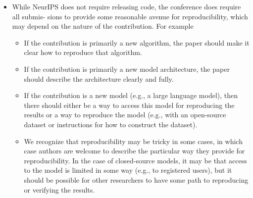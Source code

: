 \documentclass{article}
\begin{document}
\begin{enumerate}
\begin{itemize}
        \item While NeurIPS does not require releasing code, the conference does require all submis-
sions to provide some reasonable avenue for reproducibility, which may depend on the
nature of the contribution. For example
        \begin{itemize}
            \item[(a)] If the contribution is primarily a new algorithm, the paper should make it clear how
to reproduce that algorithm.
            \item[(b)] If the contribution is primarily a new model architecture, the paper should describe
the architecture clearly and fully.
            \item[(c)] If the contribution is a new model (e.g., a large language model), then there should
either be a way to access this model for reproducing the results or a way to reproduce
the model (e.g., with an open-source dataset or instructions for how to construct
the dataset).
            \item[(d)] We recognize that reproducibility may be tricky in some cases, in which case
authors are welcome to describe the particular way they provide for reproducibility.
In the case of closed-source models, it may be that access to the model is limited in
some way (e.g., to registered users), but it should be possible for other researchers
to have some path to reproducing or verifying the results.
        \end{itemize}
    \end{itemize}


\end{enumerate}
\end{document}
